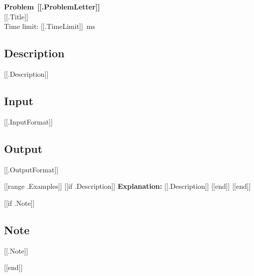 \begin{center}
  {\LARGE \textbf{Problem}~\textbf{[[.ProblemLetter]]}}\\[0.2em]
  {\LARGE [[.Title]]}\\[0.3em]
  {\large Time limit: [[.TimeLimit]]~ms}
\end{center}
\vspace{0.5em}

\subsection*{Description}
[[.Description]]

\subsection*{Input}
[[.InputFormat]]

\subsection*{Output}
[[.OutputFormat]]

[[range .Examples]]
[[if .Description]]
\vspace{0.3em}
{\small \textbf{Explanation:} [[.Description]]}
[[end]]
\vspace{0.5em}
[[end]]

[[if .Note]]
\subsection*{Note}
[[.Note]]

\vspace{0.5em}
[[end]]
